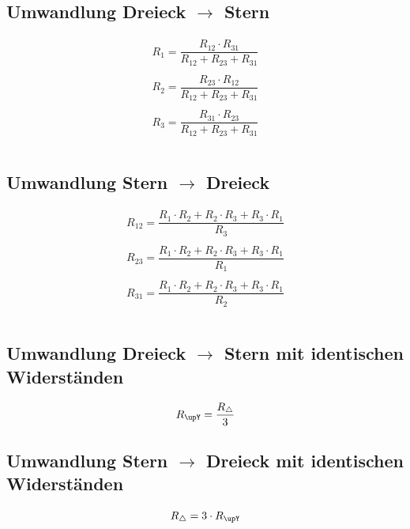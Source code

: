 \subsection{Umwandlung Dreieck $\to$ Stern}
\[ \begin{matrix}
R_1 = \dfrac{R_{12} \cdot R_{31}}{R_{12} + R_{23} + R_{31}}\\\\
R_2 = \dfrac{R_{23} \cdot R_{12}}{R_{12} + R_{23} + R_{31}}\\\\
R_3 = \dfrac{R_{31} \cdot R_{23}}{R_{12} + R_{23} + R_{31}}\\\\
\end{matrix} \]

\subsection{Umwandlung Stern $\to$ Dreieck}
\[ \begin{matrix}
R_{12} = \dfrac{R_1 \cdot R_2 + R_2 \cdot R_3 + R_3 \cdot R_1}{R_3}\\\\
R_{23} = \dfrac{R_1 \cdot R_2 + R_2 \cdot R_3 + R_3 \cdot R_1}{R_1}\\\\
R_{31} = \dfrac{R_1 \cdot R_2 + R_2 \cdot R_3 + R_3 \cdot R_1}{R_2}\\\\
\end{matrix} \]

\subsection{Umwandlung Dreieck $\to$ Stern mit identischen Widerständen}
\[ R_{\upY} = \frac{R_{\triangle}}{3} \]

\subsection{Umwandlung Stern $\to$ Dreieck mit identischen Widerständen}
\[ R_{\triangle} = 3 \cdot R_{\upY} \]
